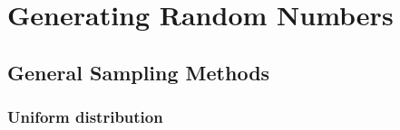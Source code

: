 \section{Generating Random Numbers}











\subsection{General Sampling Methods}

\subsubsection*{Uniform distribution}

